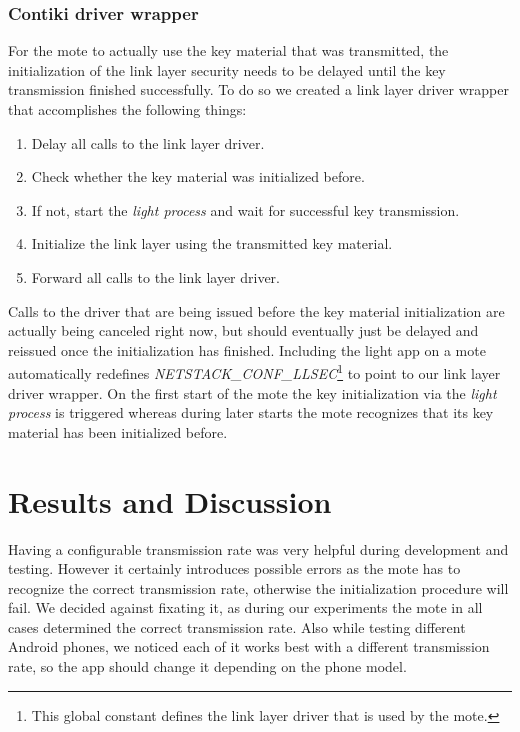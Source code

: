 \documentclass{sig-alternate} %
\begin{document}
\subsubsection{Contiki driver wrapper}
\label{ssub:contiki_driver_wrapper}

For the mote to actually use the key material that was transmitted, the initialization of the link layer security needs to be delayed until the key transmission finished successfully.
To do so we created a link layer driver wrapper that accomplishes the following things:

\begin{enumerate}
	\item Delay all calls to the link layer driver.
	\item Check whether the key material was initialized before.
	\item If not, start the \textit{light process} and wait for successful key transmission.
	\item Initialize the link layer using the transmitted key material.
	\item Forward all calls to the link layer driver.
\end{enumerate}

Calls to the driver that are being issued before the key material initialization are actually being canceled right now, but should eventually just be delayed and reissued once the initialization has finished.
Including the light app on a mote automatically redefines \textit{NETSTACK\_CONF\_LLSEC}\footnote{This global constant defines the link layer driver that is used by the mote.} to point to our link layer driver wrapper.
On the first start of the mote the key initialization via the \textit{light process} is triggered whereas during later starts the mote recognizes that its key material has been initialized before.

\section{Results and Discussion}
\label{sec:results_and_discussion}

Having a configurable transmission rate was very helpful during development and testing.
However it certainly introduces possible errors as the mote has to recognize the correct transmission rate, otherwise the initialization procedure will fail.
We decided against fixating it, as during our experiments the mote in all cases determined the correct transmission rate.
Also while testing different Android phones, we noticed each of it works best with a different transmission rate, so the app should change it depending on the phone model.
\end{document}
